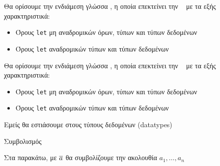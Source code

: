 \documentclass[10pt]{beamer}
\begin{document}
\begin{frame}{\FIR{}}
Θα ορίσουμε την ενδιάμεση γλώσσα \FIR{}, η οποία επεκτείνει     την    \FOMF
       ~ με τα  εξής χαρακτηριστικά:
    \begin{itemize}
        \item <2->Όρους \texttt{let} μη αναδρομικών όρων, τύπων και τύπων δεδομένων
        \item <3-> Όρους \texttt{let} αναδρομικών τύπων και τύπων δεδομένων
    \end{itemize}


\end{frame}


\begin{frame}{\FIR{}}
Θα ορίσουμε την ενδιάμεση γλώσσα \FIR{}, η οποία επεκτείνει την \FOMF
~ με τα εξής χαρακτηριστικά:
    \begin{itemize}
        \item Όρους \texttt{let} μη αναδρομικών όρων, τύπων και
         \alert{τύπων δεδομένων}
        \item Όρους \texttt{let} \alert{αναδρομικών} τύπων και
        \alert{τύπων δεδομένων}

    \end{itemize}
    Εμείς θα εστιάσουμε στους τύπους δεδομένων (datatypes)
\end{frame}



\begin{frame}{Συμβολισμός}

Στα παρακάτω, με
$\overline{a}$
θα συμβολίζουμε την ακολουθία
$ a_1, \ldots, a_n$

\end{frame}
\end{document}

